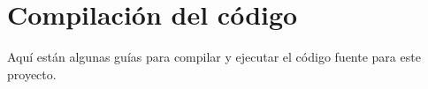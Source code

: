 \chapter{Compilación del código}

Aquí están algunas guías para compilar y ejecutar el código fuente para este proyecto.


